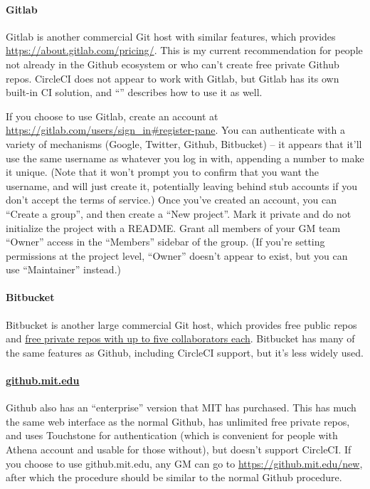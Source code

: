 \documentclass[green]{testgame}
\begin{document}
\paragraph*{Gitlab} Gitlab is another commercial Git host with similar features, which provides \href{free public and private repos to everyone}{https://about.gitlab.com/pricing/}. This is my current recommendation for people not already in the Github ecosystem or who can't create free private Github repos. CircleCI does not appear to work with Gitlab, but Gitlab has its own built-in CI solution, and ``\gCI{}'' describes how to use it as well.

If you choose to use Gitlab, create an account at \url{https://gitlab.com/users/sign_in#register-pane}. You can authenticate with a variety of mechanisms (Google, Twitter, Github, Bitbucket) -- it appears that it'll use the same username as whatever you log in with, appending a number to make it unique. (Note that it won't prompt you to confirm that you want the username, and will just create it, potentially leaving behind stub accounts if you don't accept the terms of service.) Once you've created an account, you can ``Create a group'', and then create a ``New project''. Mark it private and do not initialize the project with a README. Grant all members of your GM team ``Owner'' access in the ``Members'' sidebar of the group. (If you're setting permissions at the project level, ``Owner'' doesn't appear to exist, but you can use ``Maintainer'' instead.)

\paragraph*{Bitbucket} Bitbucket is another large commercial Git host, which provides free public repos and \href{https://bitbucket.org/product/pricing/}{free private repos with up to five collaborators each}. Bitbucket has many of the same features as Github, including CircleCI support, but it's less widely used.

\paragraph*{\href{https://github.mit.edu}{github.mit.edu}} Github also has an ``enterprise'' version that MIT has purchased. This has much the same web interface as the normal Github, has unlimited free private repos, and uses Touchstone for authentication (which is convenient for people with Athena account and usable for those without), but doesn't support CircleCI. If you choose to use github.mit.edu, any GM can go to \url{https://github.mit.edu/new}, after which the procedure should be similar to the normal Github procedure.
\end{document}
